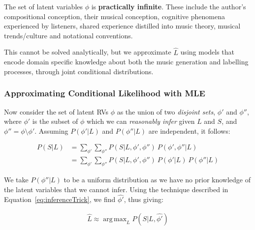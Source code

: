\documentclass[12pt,a4paper,twoside,openright]{report}
\DeclareMathOperator*{\argmax}{arg\,max}
\theoremstyle{definition}
\begin{document}
The set of latent variables $\phi$ is \textbf{practically infinite}. These include the author's compositional conception, their musical conception, cognitive phenomena experienced by listeners, shared experience distilled into music theory, musical trends/culture and notational conventions. 

This cannot be solved analytically, but we approximate $\hat{L}$ using models that encode domain specific knowledge about both the music generation and labelling processes, through joint conditional distributions. 

\subsubsection{Approximating Conditional Likelihood with MLE}

Now consider the set of latent RVs $\phi$ as the union of two \textit{disjoint sets}, $\phi'$ and $\phi''$, where $\phi'$ is the subset of $\phi$ which we can \textit{reasonably infer} given $L$ and $S$, and $\phi'' = \phi \setminus \phi'$. Assuming $P(\phi' | L)$ and $P(\phi'' | L)$ are independent, it follows:

\begin{equation}
  \begin{align}
  P(S | L) &= \sum\limits_{\phi'}\sum\limits_{\phi''} P(S | L,\phi',\phi'')~P(\phi', \phi'' |L) \\
           &= \sum\limits_{\phi'}\sum\limits_{\phi''} P(S | L,\phi',\phi'')~P(\phi' | L)~P(\phi'' |L) 
  \end{align}
  \label{eq:aceProbSolLatent}
\end{equation}

We take $P(\phi''|L)$ to be a uniform distribution as we have no prior knowledge of the latent variables that we cannot infer. 
Using the technique described in Equation~\ref{eq:inferenceTrick}, we find $\hat{\phi'}$, thus giving: 

\begin{equation}
  \begin{align}
    \hat L \approx \argmax_L P(S | L, \hat{\phi'})
  \end{align}
  \label{eq:aceProbSolLatent}
\end{equation}
\end{document}
